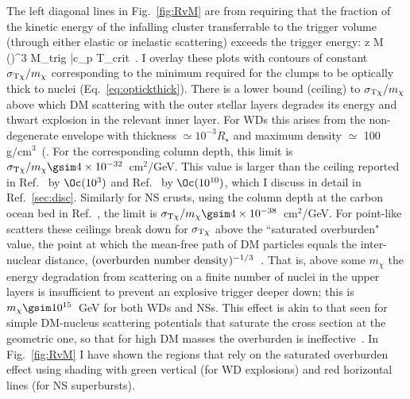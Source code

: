 \documentclass[
    twocolumn,
	prd,
        amssymb,
	preprintnumbers,
	secnumarabic,
	nofootinbib,
	superscriptaddress]{revtex4-1}
\begin{document}
The left diagonal lines in Fig.~\ref{fig:RvM} are from requiring that the fraction of the kinetic energy of the infalling cluster transferrable to the trigger volume (through either elastic or inelastic scattering) exceeds the trigger energy:
\beq
z M \bigg(\bigg)^3 \geq M_{\rm trig} \bar c_p T_{\rm crit}~.
\label{eq:RvMleftdiag}
\eeq
I overlay these plots with contours of constant $\sigma_{\rm T\chi}/m_\chi$ corresponding to the minimum required for the clumps to be optically thick to nuclei (Eq.~\eqref{eq:optickthick}).
There is a lower bound (ceiling) to $\sigma_{\rm T\chi}/m_\chi$ above which DM scattering with the outer stellar layers degrades its energy and thwart explosion in the relevant inner layer.
For WDs this arises from the non-degenerate envelope with thickness $\simeq 10^{-3} R_\star$ and maximum density $\simeq$ 100 g/cm$^3$~(\cite{text:paddytheoryastroII}.
For the corresponding column depth, this limit is $\sigma_{\rm T\chi}/m_\chi \gsim 4 \times 10^{-32}$~cm$^2$/GeV.
This value is larger than the ceiling reported in Ref.~\cite{Graham:2018efk} by  $\Oc(10^3)$ and Ref.~\cite{MACROSidhu2020} by $\Oc(10^{10})$, which I discuss in detail in Ref.~\ref{sec:disc}.
Similarly for NS crusts, using the column depth at the carbon ocean bed in Ref.~\cite{supburst:Cflashes:Cumming:2001wg}, the limit is  $\sigma_{\rm T\chi}/m_\chi \gsim 4 \times 10^{-38}$~cm$^2$/GeV.
For point-like scatters these ceilings break down for $\sigma_{\rm T\chi}$ above the ``saturated overburden" value, the point at which the mean-free path of DM particles equals the inter-nuclear distance, $({\rm overburden \ number \ density})^{-1/3}$~\cite{Bramante:2018qbc}.
That is, above some $m_\chi$ the energy degradation from scattering on a finite number of nuclei in the upper layers is insufficient to prevent an explosive trigger deeper down; this is $m_\chi \gsim 10^{15}$~GeV for both WDs and NSs.
This effect is akin to that seen for simple DM-nucleus scattering potentials that saturate the cross section at the geometric one, so that for high DM masses the overburden is ineffective~\cite{GoodmanWitten:1984dc,DigmanBarn:2019wdm}.
In Fig.~\ref{fig:RvM} I have shown the regions that rely on the saturated overburden effect using shading with green vertical (for WD explosions) and red horizontal lines (for NS superbursts). 
\end{document}
